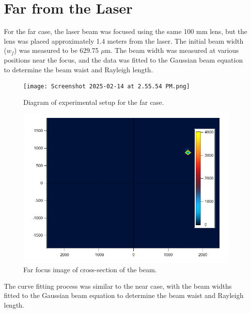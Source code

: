 \documentclass[12pt]{article}
\begin{document}
\section{Far from the Laser}
For the far case, the laser beam was focused using the same 100 mm lens, but the lens was placed approximately 1.4 meters from the laser. The initial beam width (\(w_f\)) was measured to be 629.75 \(\mu\)m. The beam width was measured at various positions near the focus, and the data was fitted to the Gaussian beam equation to determine the beam waist and Rayleigh length.

\begin{figure}[H]
    \centering
    \texttt{[image: Screenshot 2025-02-14 at 2.55.54 PM.png]}
    \caption{Diagram of experimental setup for the far case.}
    \label{fig:far-setup}
\end{figure}

\begin{figure}[H]
    \centering
    \includegraphics[width=1\linewidth]{TIF to PNG Focus.png}
    \caption{Far focus image of cross-section of the beam.}
    \label{fig:far-focus}
\end{figure}

The curve fitting process was similar to the near case, with the beam widths fitted to the Gaussian beam equation to determine the beam waist and Rayleigh length.
\end{document}
